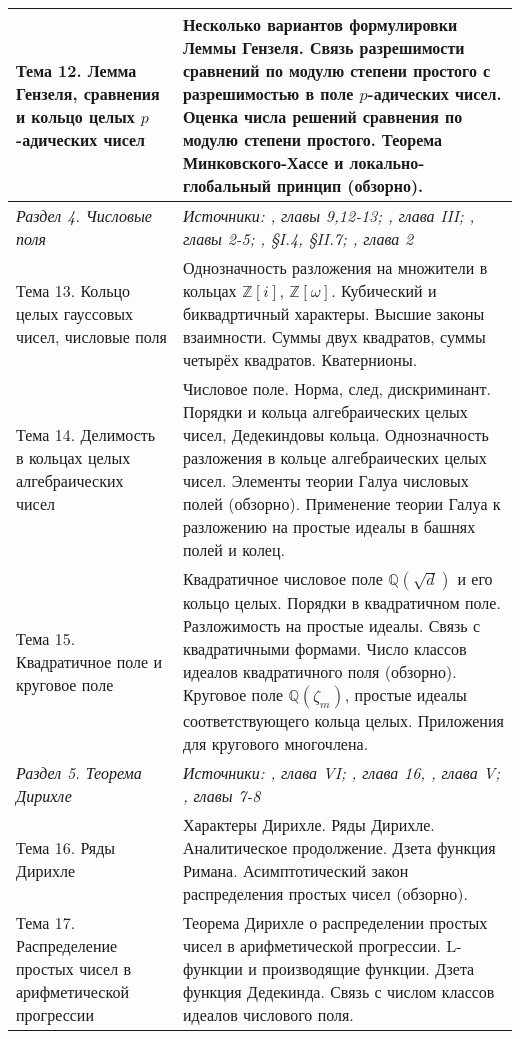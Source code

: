 \documentclass[a4paper, 12pt]{article}
\begin{document}
\begin{longtable}{ | >{\raggedright}p{6cm} | p{9cm} | }
    Тема 12. Лемма Гензеля, сравнения и кольцо целых $p$-адических чисел & Несколько вариантов формулировки Леммы Гензеля. Связь разрешимости сравнений по модулю степени простого с разрешимостью в поле $p$-адических чисел. Оценка числа решений сравнения по модулю степени простого. Теорема Минковского-Хассе и локально-глобальный принцип (обзорно). \\ \hline
    \textit{Раздел 4. Числовые поля} & \textit{Источники: \cite{IR}, главы 9,12-13; \cite{BSh}, глава III; \cite{Marc}, главы 2-5; \cite{Cox}, \S I.4, \S II.7; \cite{DSV}, глава 2} \\ \hline
    Тема 13. Кольцо целых гауссовых чисел, числовые поля & Однозначность разложения на множители в кольцах $\mathbb{Z}[i]$, $\mathbb{Z}[\omega]$. Кубический и биквадртичный характеры. Высшие законы взаимности. Суммы двух квадратов, суммы четырёх квадратов. Кватернионы. \\ \hline
    Тема 14. Делимость в кольцах целых алгебраических чисел & Числовое поле. Норма, след, дискриминант. Порядки и кольца алгебраических целых чисел, Дедекиндовы кольца. Однозначность разложения в кольце алгебраических целых чисел. Элементы теории Галуа числовых полей (обзорно). Применение теории Галуа к разложению на простые идеалы в башнях полей и колец. \\ \hline
    Тема 15. Квадратичное поле и круговое поле & Квадратичное числовое поле $\mathbb{Q}(\sqrt{d})$ и его кольцо целых. Порядки в квадратичном поле. Разложимость на простые идеалы. Связь с квадратичными формами. Число классов идеалов квадратичного поля (обзорно). Круговое поле $\mathbb{Q}(\zeta_m)$, простые идеалы соответствующего кольца целых. Приложения для кругового многочлена. \\ \hline
    \textit{Раздел 5. Теорема Дирихле} & \textit{Источники: \cite{Serre}, глава VI; \cite{IR}, глава 16, \cite{BSh}, глава V; \cite{Marc}, главы 7-8} \\ \hline
    Тема 16. Ряды Дирихле & Характеры Дирихле. Ряды Дирихле. Аналитическое продолжение. Дзета функция Римана. Асимптотический закон распределения простых чисел (обзорно). \\ \hline
    Тема 17. Распределение простых чисел в арифметической прогрессии & Теорема Дирихле о распределении простых чисел в арифметической прогрессии. L-функции и производящие функции. Дзета функция Дедекинда. Связь с числом классов идеалов числового поля. \\ \hline
    
\end{longtable}
\end{document}
